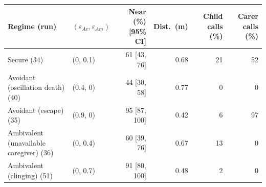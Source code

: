 \begin{tabular}{@{}llrrrr@{}}
\toprule
Regime (run) & $(\varepsilon_{Av},\varepsilon_{Am})$ & Near (\%) [95\% CI] & Dist.\ (m) & Child calls (\%) & Carer calls (\%) \\
\midrule
Secure (34) & (0, 0.1) & 61 [43, 76] & 0.68 & 21 & 52 \\
Avoidant (oscillation death) (40) & (0.4, 0) & 44 [30, 58] & 0.77 & 0 & 0 \\
Avoidant (escape) (35) & (0.9, 0) & 95 [87, 100] & 0.42 & 6 & 97 \\
Ambivalent (unavailable caregiver) (36) & (0, 0.4) & 60 [39, 76] & 0.67 & 13 & 0 \\
Ambivalent (clinging) (51) & (0, 0.7) & 91 [80, 100] & 0.48 & 2 & 0 \\
\bottomrule
\end{tabular}
